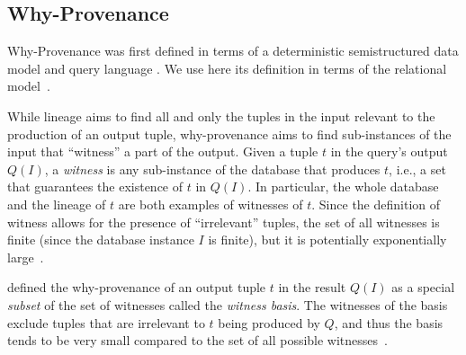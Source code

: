 \subsection{Why-Provenance}
Why-Provenance was first defined in terms of a deterministic semistructured data model and query language \citep{WhyProvBuneman}.  We use here its definition in terms of the relational model~\citep{CheneyProvSurvey}.

While lineage aims to find all and only the tuples in the input relevant to the production of an output tuple, why-provenance aims to find sub-instances of the input that ``witness'' a part of the output. 
Given a tuple $t$ in the query's output $Q(I)$, a \emph{witness} is any sub-instance of the database that produces $t$, i.e., a set that guarantees the existence of $t$ in $Q(I)$.
In particular, the whole database and the lineage of $t$ are both examples of witnesses of $t$.
Since the definition of witness allows for the presence of ``irrelevant'' tuples, the set of all witnesses is finite (since the database instance $I$ is finite), but it is potentially exponentially large~\citep{CheneyProvSurvey}.

\citet{WhyProvBuneman} defined the why-provenance of an output tuple $t$ in the result $Q(I)$ as a special \emph{subset} of the set of witnesses called the \emph{witness basis}.
The witnesses of the basis exclude tuples that are irrelevant to $t$ being produced by $Q$, and thus the basis tends to be very small compared to the set of all possible witnesses~\citep{CheneyProvSurvey}.




